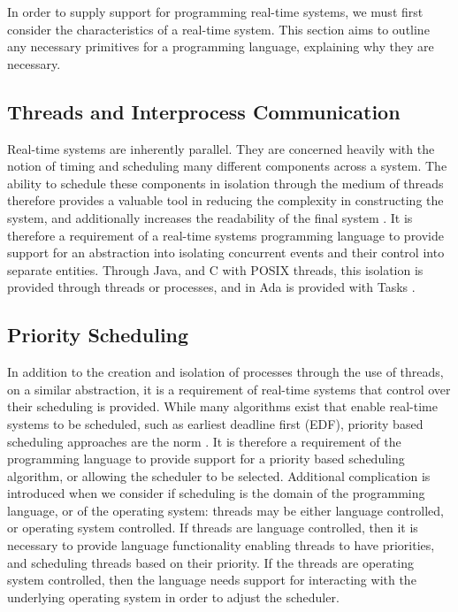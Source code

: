 In order to supply support for programming real-time systems, we must first 
consider the characteristics of a real-time system. This section aims to outline
any necessary primitives for a programming language, explaining why they are 
necessary. 

\subsection{Threads and Interprocess Communication}
Real-time systems are inherently parallel. They are concerned heavily with 
the notion of timing and scheduling many different components across a system. 
The ability to schedule these components in isolation through the medium 
of threads therefore provides a valuable tool in reducing the complexity in 
constructing the system, and additionally increases the readability of the 
final system 
\cite{BURNS +WELLING p132}. It is therefore a requirement of a real-time systems 
programming language to provide support for an abstraction into isolating 
concurrent events and their control into separate entities. Through Java, and 
C with POSIX threads, this isolation is provided through threads or processes, 
and in Ada is provided with Tasks 
\cite{books.google.co.uk/books?id=ZDRBv8U_bJ0C&pg=PA251}.

\subsection{Priority Scheduling}
In addition to the creation and isolation of processes through the use of 
threads, on a similar abstraction, it is a requirement of real-time systems 
that control over their scheduling is provided. 
While many algorithms exist that enable real-time systems to be scheduled, such 
as earliest deadline first (EDF), priority based scheduling approaches are the 
norm 
\cite{http://research.cs.queensu.ca/home/akl/techreports/scheduling.pdf}. 
It is therefore a requirement of the programming language to provide support 
for a priority based scheduling algorithm, or allowing the scheduler to be 
selected. Additional complication is introduced when we consider if scheduling 
is the domain of the programming language, or of the operating system:
threads may be either language controlled, or operating system controlled. 
If threads are language controlled, then it is necessary to provide 
language functionality enabling threads to have priorities, and scheduling threads 
based on their priority.
If the threads are operating system controlled, then the language needs 
support for interacting with the underlying operating system in order to 
adjust the scheduler. 

